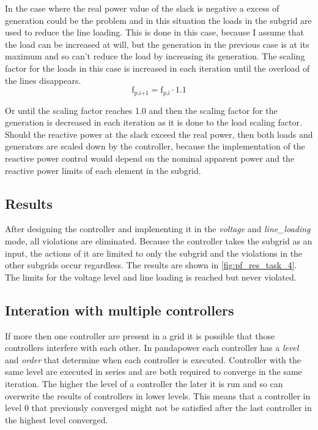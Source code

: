 \documentclass[conference]{IEEEtran}
\begin{document}
In the case where the real power value of the slack is negative a excess of generation could be the problem and in this situation the loads in the subgrid are used to reduce the line loading. This is done in this case, because I assume that the load can be increased at will, but the generation in the previous case is at its maximum and so can't reduce the load by increasing its generation. The scaling factor for the loads in this case is increased in each iteration until the overload of the lines disappears. 
\begin{equation}
	\text{f}_{\text{p,i+1}} = \text{f}_{\text{p,i}} \cdot 1.1
\end{equation}

Or until the scaling factor reaches 1.0 and then the scaling factor for the generation is decreased in each iteration as it is done to the load scaling factor. Should the reactive power at the slack exceed the real power, then both loads and generators are scaled down by the controller, because the implementation of the reactive power control would depend on the nominal apparent power and the reactive power limits of each element in the subgrid.
\subsection{Results}
After designing the controller and implenenting it in the \textit{voltage} and \textit{line\_loading} mode, all violations are eliminated. Because the controller takes the subgrid as an input, the actions of it are limited to only the subgrid and the violations in the other subgrids occur regardless. The results are shown in \cref{fig:pf_res_task_4}. The limits for the voltage level and line loading is reached but never violated.
\subsection{Interation with multiple controllers}
If more then one controller are present in a grid it is possible that those controllers interfere with each other. In pandapower each controller has a \textit{level} and \textit{order} that determine when each controller is executed. Controller with the same level are executed in series and are both required to converge in the same iteration. The higher the level of a controller the later it is run and so can overwrite the results of controllers in lower levels. This means that a controller in level 0 that previously converged might not be satisfied after the last controller in the highest level converged.
 

\end{document}
